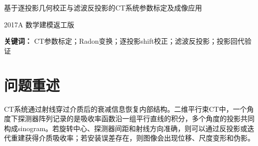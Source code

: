 \documentclass[UTF8,a4paper,12pt]{ctexart}
\begin{document}
\begin{center}
{\heiti{} 基于逐投影几何校正与滤波反投影的CT系统参数标定及成像应用}\par
\vspace{0.6cm}
{ 2017A 数学建模返工版}\par
\end{center}

\begin{abstract}
针对2017年高教社杯全国大学生数学建模竞赛A题，本文重新建立了可验证的CT系统参数标定与成像模型。旧的直接反投影方法没有让标定参数进入重建链，模板回代误差较大；返工版首先以附件1模板为已知吸收率函数，计算其Radon理论投影，再以附件2实测投影为目标，联合标定角度零点、角度步长和探测器尺度，并对每一列投影估计独立的探测器中心偏移，形成“角度--尺度--逐投影shift”的校正模型。标定结果为：角度序列
\(\theta_j=30.0897^\circ+(j-1)\times 0.9958^\circ\)，探测器尺度为1.4147 cell/radon-pixel，等价探测器间距为0.7069像素，即0.2761 mm；模板投影匹配平均相关系数达到0.9987。

在该标定参数下，本文将附件2、3、5的512探测器投影统一映射回模板Radon坐标，再采用Shepp--Logan滤波反投影重建。模板回代验证显示，baseline直接FBP的RMSE为0.3735、SSIM为0.0853；返工主模型的MAE为0.0279、RMSE为0.0607、SSIM为0.6826，投影回代RMSE为1.0017、相关系数为0.9995，说明标定参数已真实进入重建并显著改善结果。问题二10个指定点吸收率依次为0.0133, 0.8420, 0.1695, 1.5202, 1.0584, 1.6634, 1.0873, 0.0302, 0.0000, 0.0194；问题三10个指定点吸收率依次为1.1142, 2.0990, 5.5972, 0.6480, 0.9869, 2.5076, 5.3018, 0.8477, 7.2589, 0.0922。本文同时输出返工版\texttt{problem2\_rework.xls}、\texttt{problem3\_rework.xls}和支撑材料中的完整xlsx矩阵。

针对标定稳定性，本文对初始角和探测器尺度进行扰动，报告RMSE和SSIM变化，并设计由非中心圆盘、环形薄边、多方向条纹和灰度阶梯块组成的新模板。模拟投影剖面距离显示，新模板可提高不同角度投影的可区分度，从而改善角度和尺度标定的可辨识性。
\end{abstract}
\noindent\textbf{关键词：} CT参数标定；Radon变换；逐投影shift校正；滤波反投影；投影回代验证
\clearpage
\tableofcontents
\clearpage

\section{问题重述}
CT系统通过射线穿过介质后的衰减信息恢复内部结构。二维平行束CT中，一个角度下探测器阵列记录的是吸收率函数沿一组平行直线的积分，多个角度的投影共同构成sinogram。若旋转中心、探测器间距和射线方向准确，则可以通过反投影或迭代重建获得介质吸收率；若安装误差存在，则图像会出现位移、尺度变形和伪影。
\end{document}
